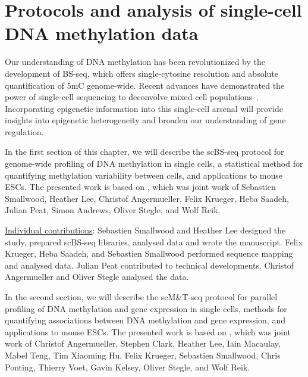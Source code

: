 \chapter{Protocols and analysis of single-cell DNA methylation data} \label{sec:pro}

\ifpdf
    \graphicspath{{Chapter3/Figs/Raster/}{Chapter3/Figs/PDF/}{Chapter3/Figs/}}
\else
    \graphicspath{{Chapter3/Figs/Vector/}{Chapter3/Figs/}}
\fi

Our understanding of DNA methylation has been revolutionized by the development of BS-seq, which offers single-cytosine resolution and absolute quantification of 5mC genome-wide. Recent advances have demonstrated the power of single-cell sequencing to deconvolve mixed cell populations~\citep{jain_supervised_2007,deng_single-cell_2014,macaulay_single_2014}. Incorporating epigenetic information into this single-cell arsenal will provide insights into epigenetic heterogeneity and broaden our understanding of gene regulation.

In the first section of this chapter, we will describe the scBS-seq protocol for genome-wide profiling of DNA methylation in single cells, a statistical method for quantifying methylation variability between cells, and applications to mouse ESCs. The presented work is based on \citet{smallwood_single-cell_2014}, which was joint work of Sebastien Smallwood, Heather Lee, Christof Angermueller, Felix Krueger, Heba Saadeh, Julian Peat, Simon Andrews, Oliver Stegle, and Wolf Reik.

\begin{center}
\begin{minipage}{.9\linewidth}
\underline{Individual contributions}: Sebastien Smallwood and Heather Lee designed the study, prepared scBS-seq libraries, analysed data and wrote the manuscript. Felix Krueger, Heba Saadeh, and Sebastien Smallwood performed sequence mapping and analysed data. Julian Peat contributed to technical developments. Christof Angermueller and Oliver Stegle analysed the data.
\end{minipage}
\end{center}

In the second section, we will describe the scM\&T-seq protocol for parallel profiling of DNA methylation and gene expression in single cells, methods for quantifying associations between DNA methylation and gene expression, and applications to mouse ESCs. The presented work is based on \citet{angermueller_parallel_2016}, which was joint work of Christof Angermueller, Stephen Clark, Heather Lee, Iain Macaulay, Mabel Teng, Tim Xiaoming Hu, Felix Krueger, Sebastien Smallwood, Chris Ponting, Thierry Voet, Gavin Kelsey, Oliver Stegle, and Wolf Reik.

